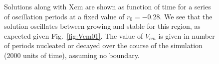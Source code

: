 \documentclass[pre,preprint,superscriptaddress]{revtex4-1}
\begin{document}
\begin{figure}[h!]
\begin{center}
{      }
    \caption{Solutions along with Xcm are shown as  function of time for a series of oscillation periods at a fixed value of $r_0=-0.28$.  We see that the solution oscillates between growing and stable for this region, as expected given Fig.~\ref{fig:Vcm01}.  The value of $V_{cm}$ is given in number of periods nucleated or decayed over the course of the simulation (2000 units of time), assuming no boundary.}
    \label{fig:r28slice1}
  \end{center}
\end{figure} 

 \begin{figure}[h!]
  \begin{center}
        \mbox{
	\quad 
      } \mbox{
	\quad
}
\end{center}
\end{figure}
\end{document}
